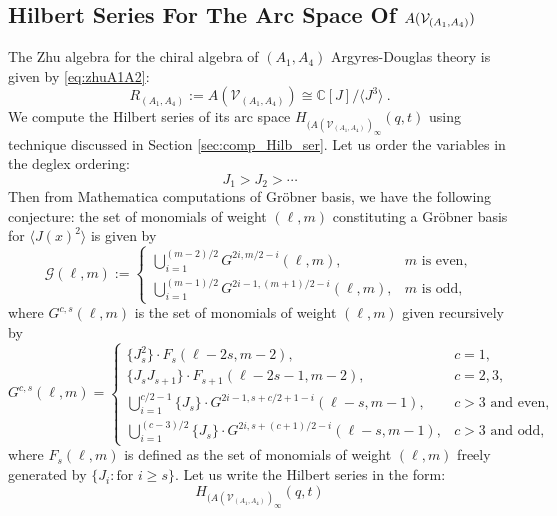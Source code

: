\documentclass[a4paper,10pt]{article}
\def\CV {{\cal V}}
\begin{document}
\begin{appendix}
\section{Hilbert Series For The Arc Space Of $A(\CV_{(A_1,A_4)})$}\label{app:Hilb_A1A4}
The Zhu algebra for the chiral algebra of $(A_1,A_4)$ Argyres-Douglas theory is given by \eqref{eq:zhuA1A2}:
\begin{equation}
R_{(A_1,A_4)}:=A\left(\mathcal{V}_{\left(A_1, A_4\right)}\right) \cong \mathds{C}[J]/\langle J^3\rangle~.
\end{equation}
We compute the Hilbert series of its arc space 
$H_{(A(\mathcal{V}_{(A_1,A_4)})_\infty}(q,t)$ using technique discussed in Section \ref{sec:comp_Hilb_ser}. Let us  order the variables in the deglex ordering:
\begin{equation}
    J_1>J_2>\cdots
\end{equation}
Then from Mathematica computations of Gr\"{o}bner basis, we have the following conjecture: the
set of monomials of weight $(\ell,m)$ constituting a Gr\"obner basis for $\langle J(x)^2\rangle$ is given by
\begin{equation}
    \mathcal{G} (\ell,m) := \begin{cases}
\bigcup_{i = 1}^{(m-2)/2} G^{2i, m/2 - i}(\ell,m), & m \text{ is even},\\
\bigcup_{i = 1}^{(m-1)/2} G^{2i -1 , (m+1)/2 -i}(\ell,m), & m \text{ is odd},
\end{cases}
\end{equation}
where $G^{c,s}(\ell,m)$ is the set of monomials of weight $(\ell,m)$ given recursively by
\begin{equation}\label{eq:Grob_recusive_A1A4}
    G^{c,s}(\ell,m) = \begin{cases}
\{J_s^2\}\cdot F_s(\ell-2s, m -2), & c = 1, \\
\{J_s J_{s+1}\}\cdot F_{s+1}(\ell -2s -1, m -2), & c= 2,3,\\
\bigcup_{i = 1}^{c/2 -1} \{J_s\}\cdot G^{2i -1, s + c/2 +1 -i}(\ell-s , m-1), & c>3 \text{ and even}, \\
\bigcup_{i = 1}^{(c-3)/2}\{J_s\}\cdot G^{2i , s + (c+1)/2 -i}(\ell-s, m-1), & c>3 \text{ and odd,}
\end{cases}
\end{equation}
where $F_s(\ell,m)$ is defined as the set of monomials of weight $(\ell,m)$ freely generated by $\{J_i: \text{for } i\geq s \}$.
Let us write the Hilbert series in the form:
\begin{equation}
    H_{(A(\mathcal{V}_{(A_1,A_4)})_\infty}(q,t)

\end{equation}
\end{appendix}
\end{document}
